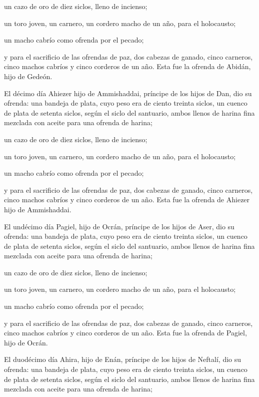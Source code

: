 \begin{paracol}{2}
 un cazo de oro de diez siclos, lleno de incienso;

 un toro joven, un carnero, un cordero macho de un año,
para el holocausto;

 un macho cabrío como ofrenda por el pecado;

 y para el sacrificio de las ofrendas de paz, dos cabezas
de ganado, cinco carneros, cinco machos cabríos y cinco corderos de un
año. Esta fue la ofrenda de Abidán, hijo de Gedeón.

 El décimo día Ahiezer hijo de Ammishaddai, príncipe de
los hijos de Dan,  dio su ofrenda: una bandeja de plata,
cuyo peso era de ciento treinta siclos, un cuenco de plata de setenta
siclos, según el siclo del santuario, ambos llenos de harina fina
mezclada con aceite para una ofrenda de harina;

 un cazo de oro de diez siclos, lleno de incienso;

 un toro joven, un carnero, un cordero macho de un año,
para el holocausto;

 un macho cabrío como ofrenda por el pecado;

 y para el sacrificio de las ofrendas de paz, dos cabezas
de ganado, cinco carneros, cinco machos cabríos y cinco corderos de un
año. Esta fue la ofrenda de Ahiezer hijo de Ammishaddai.

 El undécimo día Pagiel, hijo de Ocrán, príncipe de los
hijos de Aser,  dio su ofrenda: una bandeja de plata,
cuyo peso era de ciento treinta siclos, un cuenco de plata de setenta
siclos, según el siclo del santuario, ambos llenos de harina fina
mezclada con aceite para una ofrenda de harina;

 un cazo de oro de diez siclos, lleno de incienso;

 un toro joven, un carnero, un cordero macho de un año,
para el holocausto;

 un macho cabrío como ofrenda por el pecado;

 y para el sacrificio de las ofrendas de paz, dos cabezas
de ganado, cinco carneros, cinco machos cabríos y cinco corderos de un
año. Esta fue la ofrenda de Pagiel, hijo de Ocrán.

 El duodécimo día Ahira, hijo de Enán, príncipe de los
hijos de Neftalí,  dio su ofrenda: una bandeja de plata,
cuyo peso era de ciento treinta siclos, un cuenco de plata de setenta
siclos, según el siclo del santuario, ambos llenos de harina fina
mezclada con aceite para una ofrenda de harina;


\end{paracol}
